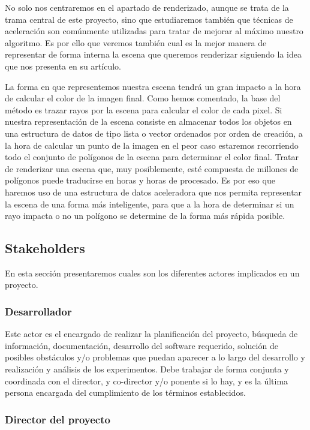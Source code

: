 \documentclass[titlepage,12pt]{report}
\begin{document}
No solo nos centraremos en el apartado de renderizado, aunque se trata de la trama central de este proyecto, sino que estudiaremos también que técnicas de aceleración son comúnmente utilizadas para tratar de mejorar al máximo nuestro algoritmo. Es por ello que veremos también cual es la mejor manera de representar de forma interna la escena que queremos renderizar siguiendo la idea que nos presenta \citep{Karras2012} en su artículo.

La forma en que representemos nuestra escena tendrá un gran impacto a la hora de calcular el color de la imagen final. Como hemos comentado, la base del método es trazar rayos por la escena para calcular el color de cada pixel. Si nuestra representación de la escena consiste en almacenar todos los objetos en una estructura de datos de tipo lista o vector ordenados por orden de creación, a la hora de calcular un punto de la imagen en el peor caso estaremos recorriendo todo el conjunto de polígonos de la escena para determinar el color final. Tratar de renderizar una escena que, muy posiblemente, esté compuesta de millones de polígonos puede traducirse en horas y horas de procesado. Es por eso que haremos uso de una estructura de datos aceleradora que nos permita representar la escena de una forma más inteligente, para que a la hora de determinar si un rayo impacta o no un polígono se determine de la forma más rápida posible.

\subsection{Stakeholders}

En esta sección presentaremos cuales son los diferentes actores implicados en un proyecto.

\subsubsection{Desarrollador}

Este actor es el encargado de realizar la planificación del proyecto, búsqueda de información, documentación, desarrollo del software requerido, solución de posibles obstáculos y/o problemas que puedan aparecer a lo largo del desarrollo y realización y análisis de los experimentos. Debe trabajar de forma conjunta y coordinada con el director, y co-director y/o ponente si lo hay, y es la última persona encargada del cumplimiento de los términos establecidos.

\subsubsection{Director del proyecto}
\end{document}
